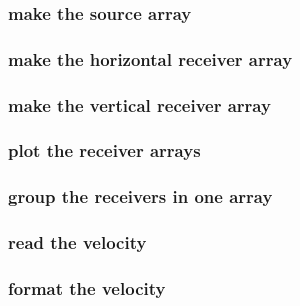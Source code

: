 \begin{frame} \frametitle{make the source array}
  \normalsize
  \blueshade{
    
  }
\end{frame}
\cwpnote{}

\begin{frame} \frametitle{make the horizontal receiver array}
  \normalsize
  \blueshade{
    
  }
\end{frame}
\cwpnote{}

\begin{frame} \frametitle{make the vertical receiver array}
  \normalsize
  \blueshade{
    
  }
\end{frame}
\cwpnote{}

\begin{frame} \frametitle{plot the receiver arrays}
  \normalsize
  \blueshade{
    
  }
\end{frame}
\cwpnote{}

\begin{frame}  \end{frame}

\begin{frame} \frametitle{group the receivers in one array}
  \normalsize
  \blueshade{
    
  }
\end{frame}
\cwpnote{}

\begin{frame} \frametitle{read the velocity}
  \normalsize
  \blueshade{
    
  }
\end{frame}
\cwpnote{}

\begin{frame} \frametitle{format the velocity}
  \normalsize
  \blueshade{
    
  }
\end{frame}
\cwpnote{}

